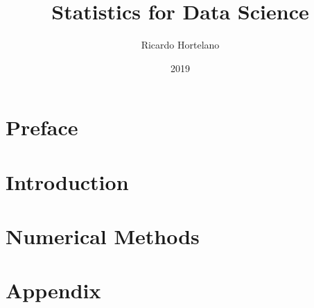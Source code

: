\documentclass[12pt]{book}
\title{
{Statistics for Data Science}\\
}
\author{Ricardo Hortelano}
\date{2019}
\begin{document}
\maketitle
\tableofcontents

\chapter*{Preface}


\chapter{Introduction}


\chapter{Numerical Methods}


\appendix
\chapter{Appendix}


\printbibliography
\end{document}
